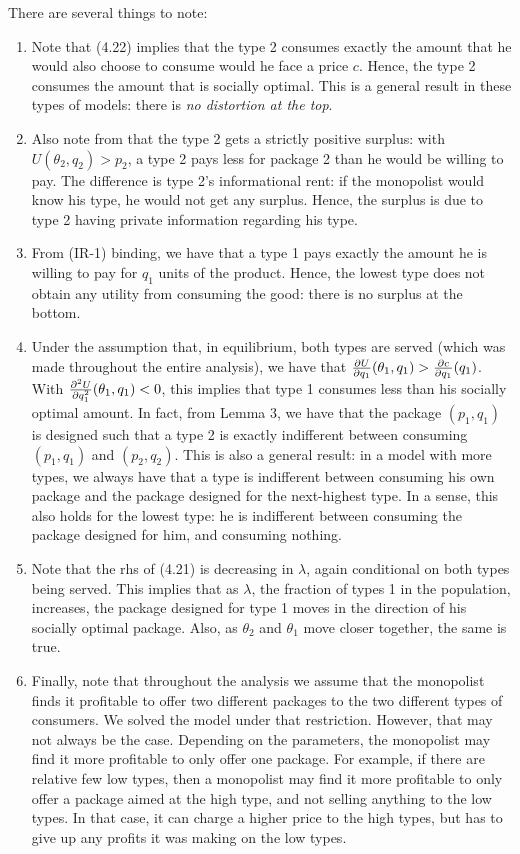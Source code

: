 There are several things to note:
\begin{enumerate}
	\item Note that (4.22) implies that the type 2 consumes exactly the amount that he would
	      also choose to consume would he face a price $c$. Hence, the type 2 consumes the
	      amount that is socially optimal. This is a general result in these types of models:
	      there is \textit{no distortion at the top}.
	\item Also note from that the type 2 gets a strictly positive surplus: with
	      $U (\theta_2, q_2) > p_2$, a type 2 pays less for package 2 than he would be willing to pay.
	      The difference is type 2’s informational rent: if the monopolist would know his
	      type, he would not get any surplus. Hence, the surplus is due to type 2 having
	      private information regarding his type.
	\item From (IR-1) binding, we have that a type 1 pays exactly the amount he is willing to pay
	      for $q_1$ units of the product. Hence, the lowest type does not obtain any utility from
	      consuming the good: there is no surplus at the bottom.
	\item Under the assumption that, in equilibrium, both types are served (which was
	      made throughout the entire analysis), we have that $\frac{\partial U}{\partial q_1}(\theta_1, q_1)>\frac{\partial c}{\partial q_1} (q_1)$. With
	      $\frac{\partial^2 U}{\partial q_1^2} (\theta_1, q_1) < 0$, this implies that type 1 consumes less than his socially optimal
	      amount. In fact, from Lemma 3, we have that the package $(p_1, q_1)$ is designed such
	      that a type 2 is exactly indifferent between consuming $(p_1, q_1)$ and $(p_2, q_2)$. This is
	      also a general result: in a model with more types, we always have that a type is
	      indifferent between consuming his own package and the package designed for the
	      next-highest type. In a sense, this also holds for the lowest type: he is indifferent
	      between consuming the package designed for him, and consuming nothing.
	\item Note that the rhs of (4.21) is decreasing in $\lambda$, again conditional on both types being
	      served. This implies that as $\lambda$, the fraction of types 1 in the population, increases,
	      the package designed for type 1 moves in the direction of his socially optimal package. Also, as
	      $\theta_2$ and $\theta_1$ move closer together, the same is true.
	\item Finally, note that throughout the analysis we assume that the monopolist finds it
	      profitable to offer two different packages to the two different types of consumers.
	      We solved the model under that restriction. However, that may not always be the
	      case. Depending on the parameters, the monopolist may find it more profitable
	      to only offer one package. For example, if there are relative few low types, then a
	      monopolist may find it more profitable to only offer a package aimed at the high
	      type, and not selling anything to the low types. In that case, it can charge a higher
	      price to the high types, but has to give up any profits it was making on the low
	      types.
\end{enumerate}
